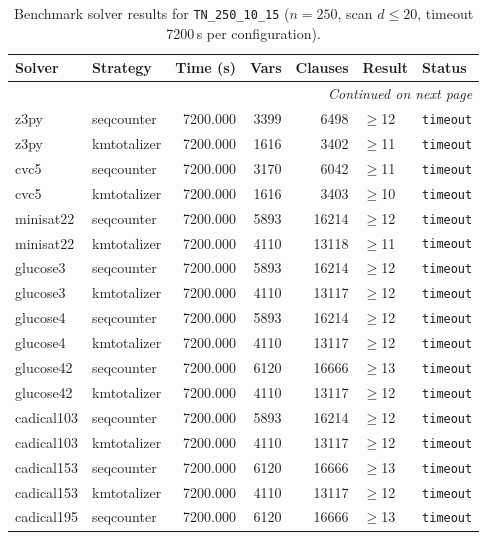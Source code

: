 \begin{longtable}{llrrrl p{}}
\caption{Benchmark solver results for \texttt{TN\_250\_10\_15} ($n=250$, scan $d \leq 20$, timeout 7200\,s per configuration).} \label{tab:bench-TN_250_10_15} \\
\toprule
Solver & Strategy & Time (s) & Vars & Clauses & Result & Status \\
\midrule
\endhead
\midrule
\multicolumn{7}{r}{\textit{Continued on next page}} \\
\midrule
\endfoot
\bottomrule
\endlastfoot
z3py & seqcounter & 7200.000 & 3399 & 6498 & $\geq$12 & \texttt{timeout} \\
z3py & kmtotalizer & 7200.000 & 1616 & 3402 & $\geq$11 & \texttt{timeout} \\
cvc5 & seqcounter & 7200.000 & 3170 & 6042 & $\geq$11 & \texttt{timeout} \\
cvc5 & kmtotalizer & 7200.000 & 1616 & 3403 & $\geq$10 & \texttt{timeout} \\
minisat22 & seqcounter & 7200.000 & 5893 & 16214 & $\geq$12 & \texttt{timeout} \\
minisat22 & kmtotalizer & 7200.000 & 4110 & 13118 & $\geq$11 & \texttt{timeout} \\
glucose3 & seqcounter & 7200.000 & 5893 & 16214 & $\geq$12 & \texttt{timeout} \\
glucose3 & kmtotalizer & 7200.000 & 4110 & 13117 & $\geq$12 & \texttt{timeout} \\
glucose4 & seqcounter & 7200.000 & 5893 & 16214 & $\geq$12 & \texttt{timeout} \\
glucose4 & kmtotalizer & 7200.000 & 4110 & 13117 & $\geq$12 & \texttt{timeout} \\
glucose42 & seqcounter & 7200.000 & 6120 & 16666 & $\geq$13 & \texttt{timeout} \\
glucose42 & kmtotalizer & 7200.000 & 4110 & 13117 & $\geq$12 & \texttt{timeout} \\
cadical103 & seqcounter & 7200.000 & 5893 & 16214 & $\geq$12 & \texttt{timeout} \\
cadical103 & kmtotalizer & 7200.000 & 4110 & 13117 & $\geq$12 & \texttt{timeout} \\
cadical153 & seqcounter & 7200.000 & 6120 & 16666 & $\geq$13 & \texttt{timeout} \\
cadical153 & kmtotalizer & 7200.000 & 4110 & 13117 & $\geq$12 & \texttt{timeout} \\
cadical195 & seqcounter & 7200.000 & 6120 & 16666 & $\geq$13 & \texttt{timeout} \\

\end{longtable}
